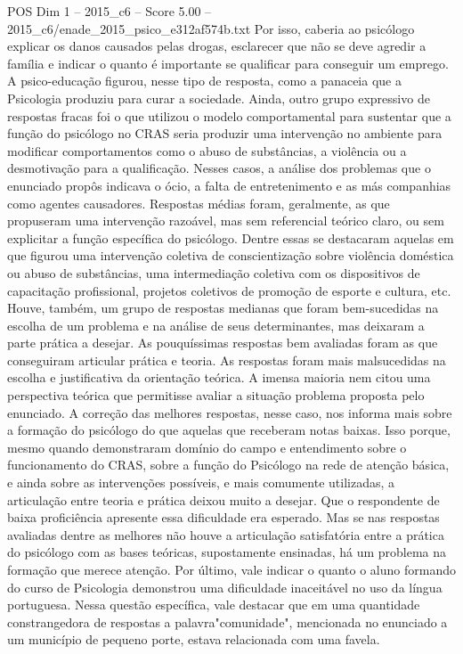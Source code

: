 \begin{textsample}{POS Dim 1 – 2015\_c6 – Score 5.00 – 2015\_c6/enade\_2015\_psico\_e312af574b.txt}
Por isso, caberia ao psicólogo explicar os danos causados pelas drogas, esclarecer que não se deve agredir a família e indicar o quanto é importante se qualificar para conseguir um emprego.
A psico-educação figurou, nesse tipo de resposta, como a panaceia que a Psicologia produziu para curar a sociedade.
Ainda, outro grupo expressivo de respostas fracas foi o que utilizou o modelo comportamental para sustentar que a função do psicólogo no CRAS seria produzir uma intervenção no ambiente para modificar comportamentos como o abuso de substâncias, a violência ou a desmotivação para a qualificação.
Nesses casos, a análise dos problemas que o enunciado propôs indicava o ócio, a falta de entretenimento e as más companhias como agentes causadores.
Respostas médias foram, geralmente, as que propuseram uma intervenção razoável, mas sem referencial teórico claro, ou sem explicitar a função específica do psicólogo.
Dentre essas se destacaram aquelas em que figurou uma intervenção coletiva de conscientização sobre violência doméstica ou abuso de substâncias, uma intermediação coletiva com os dispositivos de capacitação profissional, projetos coletivos de promoção de esporte e cultura, etc.
Houve, também, um grupo de respostas medianas que foram bem-sucedidas na escolha de um problema e na análise de seus determinantes, mas deixaram a parte prática a desejar.
As pouquíssimas respostas bem avaliadas foram as que conseguiram articular prática e teoria.
As respostas foram mais malsucedidas na escolha e justificativa da orientação teórica.
A imensa maioria nem citou uma perspectiva teórica que permitisse avaliar a situação problema proposta pelo enunciado.
A correção das melhores respostas, nesse caso, nos informa mais sobre a formação do psicólogo do que aquelas que receberam notas baixas.
Isso porque, mesmo quando demonstraram domínio do campo e entendimento sobre o funcionamento do CRAS, sobre a função do Psicólogo na rede de atenção básica, e ainda sobre as intervenções possíveis, e mais comumente utilizadas, a articulação entre teoria e prática deixou muito a desejar.
Que o respondente de baixa proficiência apresente essa dificuldade era esperado.
Mas se nas respostas avaliadas dentre as melhores não houve a articulação satisfatória entre a prática do psicólogo com as bases teóricas, supostamente ensinadas, há um problema na formação que merece atenção.
Por último, vale indicar o quanto o aluno formando do curso de Psicologia demonstrou uma dificuldade inaceitável no uso da língua portuguesa.
Nessa questão específica, vale destacar que em uma quantidade constrangedora de respostas a palavra"comunidade", mencionada no enunciado a um município de pequeno porte, estava relacionada com uma favela.

\end{textsample}
